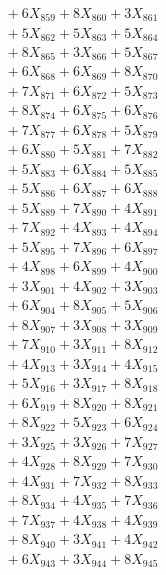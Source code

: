 \documentclass[a4paper,10pt]{article}
\begin{document}
{\begin{align}
&\;  + 6 X_{859} + 8 X_{860} + 3 X_{861} \\[0.3ex]
&\;  + 5 X_{862} + 5 X_{863} + 5 X_{864} \\[0.3ex]
&\;  + 8 X_{865} + 3 X_{866} + 5 X_{867} \\[0.3ex]
&\;  + 6 X_{868} + 6 X_{869} + 8 X_{870} \\[0.3ex]
&\;  + 7 X_{871} + 6 X_{872} + 5 X_{873} \\[0.3ex]
&\;  + 8 X_{874} + 6 X_{875} + 6 X_{876} \\[0.3ex]
&\;  + 7 X_{877} + 6 X_{878} + 5 X_{879} \\[0.5ex]\allowbreak
&\;  + 6 X_{880} + 5 X_{881} + 7 X_{882} \\[0.3ex]
&\;  + 5 X_{883} + 6 X_{884} + 5 X_{885} \\[0.3ex]
&\;  + 5 X_{886} + 6 X_{887} + 6 X_{888} \\[0.3ex]
&\;  + 5 X_{889} + 7 X_{890} + 4 X_{891} \\[0.3ex]
&\;  + 7 X_{892} + 4 X_{893} + 4 X_{894} \\[0.3ex]
&\;  + 5 X_{895} + 7 X_{896} + 6 X_{897} \\[0.3ex]
&\;  + 4 X_{898} + 6 X_{899} + 4 X_{900} \\[0.3ex]
&\;  + 3 X_{901} + 4 X_{902} + 3 X_{903} \\[0.3ex]
&\;  + 6 X_{904} + 8 X_{905} + 5 X_{906} \\[0.3ex]
&\;  + 8 X_{907} + 3 X_{908} + 3 X_{909} \\[0.5ex]\allowbreak
&\;  + 7 X_{910} + 3 X_{911} + 8 X_{912} \\[0.3ex]
&\;  + 4 X_{913} + 3 X_{914} + 4 X_{915} \\[0.3ex]
&\;  + 5 X_{916} + 3 X_{917} + 8 X_{918} \\[0.3ex]
&\;  + 6 X_{919} + 8 X_{920} + 8 X_{921} \\[0.3ex]
&\;  + 8 X_{922} + 5 X_{923} + 6 X_{924} \\[0.3ex]
&\;  + 3 X_{925} + 3 X_{926} + 7 X_{927} \\[0.3ex]
&\;  + 4 X_{928} + 8 X_{929} + 7 X_{930} \\[0.3ex]
&\;  + 4 X_{931} + 7 X_{932} + 8 X_{933} \\[0.3ex]
&\;  + 8 X_{934} + 4 X_{935} + 7 X_{936} \\[0.3ex]
&\;  + 7 X_{937} + 4 X_{938} + 4 X_{939} \\[0.5ex]\allowbreak
&\;  + 8 X_{940} + 3 X_{941} + 4 X_{942} \\[0.3ex]
&\;  + 6 X_{943} + 3 X_{944} + 8 X_{945} \\[0.3ex]

\end{align}}
\end{document}
